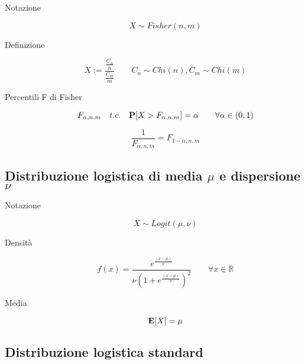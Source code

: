 \begin{description}
	
	\item [Notazione]
		\begin{equation}
		X \sim Fisher(n,m)
		\end{equation}
	
	\item [Definizione]
		\begin{equation}
		X := \frac{\frac{C_{n}}{n}}{\frac{C_{m}}{m}} \qquad C_{n} \sim Chi(n),C_{m} \sim Chi(m)
		\end{equation}
	
	\item [Percentili F di Fisher]
		\begin{equation}
		F_{\alpha,n,m}\quad t.c. \quad \mathbf{P}[X > F_{\alpha,n,m}] = \alpha \qquad\forall \alpha \in (0,1)
		\end{equation}
	
		\begin{equation}
		\frac{1}{F_{\alpha,n,m}} = F_{1-\alpha,n,m}
		\end{equation}
	
\end{description}


\subsection{Distribuzione logistica di media $\mu$ e dispersione $\nu$}

\begin{description}
	
	\item [Notazione]
	\begin{equation}
		X \sim Logit(\mu,\nu)
	\end{equation}
	
	\item [Densità]
		\begin{equation}
		f(x) = \frac{e^{\frac{(x-\mu)}{\nu}}}{\nu (1+e^{\frac{(x-\mu)}{\nu}})^{2}} \qquad\forall x \in \mathbb{R}
		\end{equation}
		
	\item [Media]
		\begin{equation}
		\mathbf{E}[X] = \mu
		\end{equation}		
	\end{description}


\subsection{Distribuzione logistica standard}

